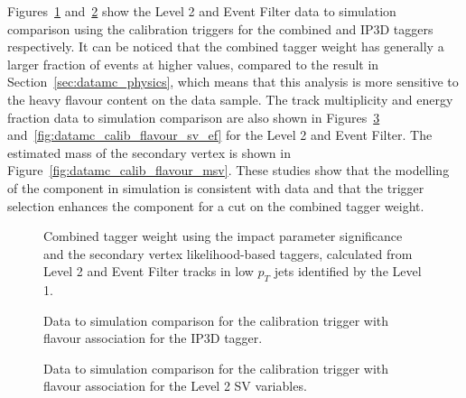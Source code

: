 Figures~\ref{fig:datamc_calib_flavour_comb} and~\ref{fig:datamc_calib_flavour_ip3d} show the Level 2 and Event Filter data to simulation
comparison using the calibration triggers for the combined and IP3D taggers respectively.
It can be noticed that the combined tagger weight has generally a larger fraction of events
at higher values, compared to the result in Section~\ref{sec:datamc_physics}, which means that this analysis is more sensitive to the
heavy flavour content on the data sample.
The track multiplicity and energy fraction data to simulation comparison are also shown in
Figures~\ref{fig:datamc_calib_flavour_sv_l2} and~\ref{fig:datamc_calib_flavour_sv_ef} for the Level 2 and Event Filter.
The estimated mass of the secondary vertex is shown in Figure~\ref{fig:datamc_calib_flavour_msv}.
These studies show that the modelling of the \bjet component in simulation is consistent with data and that the \bjet trigger
selection enhances the \bjet component for a cut on the combined tagger weight.

\begin{figure}[H]
\caption{Combined tagger weight using the impact parameter significance and the secondary vertex likelihood-based taggers, calculated from Level 2 and Event Filter tracks in low $p_T$ jets identified by the Level 1.}
\label{fig:datamc_calib_flavour_comb}
\end{figure}

\begin{figure}[H]
\caption{Data to simulation comparison for the calibration trigger with flavour association for the IP3D tagger.}
\label{fig:datamc_calib_flavour_ip3d}
\end{figure}


\begin{figure}[H]
\caption{Data to simulation comparison for the calibration trigger with flavour association for the Level 2 SV variables.}
\label{fig:datamc_calib_flavour_sv_l2}
\end{figure}

